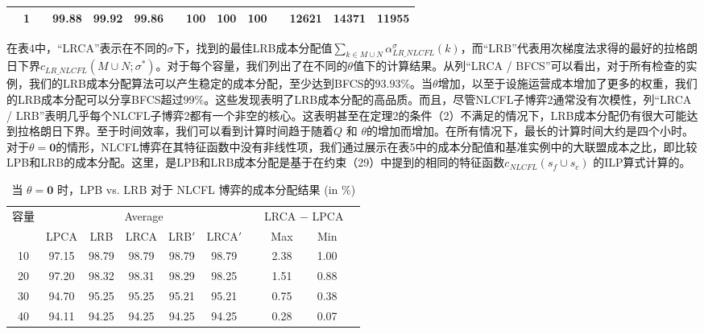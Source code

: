 \documentclass[UTF8]{article}
\begin{document}
\begin{定义}
\begin{table}[H]
\begin{tabular}[!h]{c c c c c c c c c c c c c c}
      &1  &  &99.88	&99.92	&99.86	&	&100	&100	&100	&	&12621	&14371	&11955\\
      \hline
      \end{tabular}
      \vspace{-3mm}
      \end{table}
      在表4中，“LRCA”表示在不同的$\sigma$下，找到的最佳LRB成本分配值$\sum_{k \in M \cup N}\alpha_{LR\_NLCFL}^{\sigma}(k)$，而“LRB”代表用次梯度法求得的最好的拉格朗日下界$c_{LR\_NLCFL}(M \cup N; \sigma^*)$。对于每个容量，我们列出了在不同的$\theta$值下的计算结果。从列“LRCA / BFCS”可以看出，对于所有检查的实例，我们的LRB成本分配算法可以产生稳定的成本分配，至少达到BFCS的$93.93\%$。当$\theta$增加，以至于设施运营成本增加了更多的权重，我们的LRB成本分配可以分享BFCS超过$99\%$。这些发现表明了LRB成本分配的高品质。而且，尽管NLCFL子博弈2通常没有次模性，列“LRCA / LRB”表明几乎每个NLCFL子博弈2都有一个非空的核心。这表明甚至在定理2的条件（2）不满足的情况下，LRB成本分配仍有很大可能达到拉格朗日下界。至于时间效率，我们可以看到计算时间趋于随着$Q$ 和 $\theta$的增加而增加。在所有情况下，最长的计算时间大约是四个小时。
      对于$\theta=\textbf{0}$的情形，NLCFL博弈在其特征函数中没有非线性项，我们通过展示在表5中的成本分配值和基准实例中的大联盟成本之比，即比较LPB和LRB的成本分配。这里，是LPB和LRB成本分配是基于在约束（29）中提到的相同的特征函数$c_{NLCFL}(s_f \cup s_c)$ 的ILP算式计算的。
      \begin{table}[H]
      \vspace{-2mm}
      \centering
      \tabcolsep=14pt
      \small
      \renewcommand\arraystretch{1.5}
      \caption{\label{table:LRBLPBSG} 当 $\theta = \textbf{0}$ 时，LPB vs. LRB 对于 NLCFL 博弈的成本分配结果 (in \%)}
      \begin{tabular}[!h]{c c c c c c c c c c}
      \hline
      \multirow{2}{*}{容量} & \multicolumn{5}{c}{Average}	&\multicolumn{1}{c}{} & \multicolumn{2}{c}{LRCA $-$ LPCA}\\
      \cline{2-6}
      \cline{8-9}
      & LPCA & LRB & LRCA	& LRB$'$ & LRCA$'$	& &Max	&Min\\
      \hline
      10    &97.15	&98.79	&98.79	&98.79	&98.79	&	&2.38	&1.00\\

      20    &97.20	&98.32	&98.31	&98.29	&98.25	&	&1.51	&0.88\\

      30    &94.70	&95.25	&95.25	&95.21	&95.21	&	&0.75	&0.38\\

      40    &94.11	&94.25	&94.25	&94.25	&94.25	&	&0.28	&0.07\\


\end{tabular}
\end{table}
\end{定义}
\end{document}
